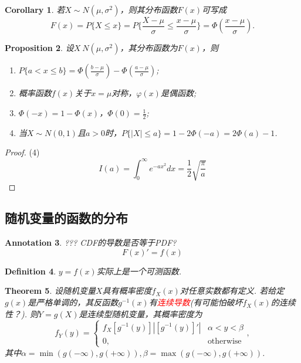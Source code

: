 \documentclass{article}
\newtheorem{theorem}{Theorem}[section]
\newtheorem{corollary}[theorem]{Corollary}
\newtheorem{proposition}[theorem]{Proposition}
\newtheorem{definition}[theorem]{Definition}
\newtheorem{annotation}[theorem]{Annotation}
\newcommand{\redt}[1]{\textcolor{red}{#1}}
\begin{document}
\begin{corollary}
\rm 若$X \sim N(\mu,\sigma^2)$，则其分布函数$F(x)$可写成
$$
F(x) = P\{X \leq x \} = P\{ \frac{X-\mu}{\sigma} \leq \frac{x-\mu}{\sigma} \} = \Phi(\frac{x-\mu}{\sigma}). 
$$
\end{corollary}

\begin{proposition}
\rm 设$X~N(\mu,\sigma^2)$，其分布函数为$F(x)$，则
\begin{enumerate}
	\item $P\{a < x \leq b\} = \Phi(\frac{b-\mu}{\sigma}) - \Phi(\frac{a-\mu}{\sigma})$;
	\item 概率函数$f(x)$关于$x=\mu$对称，$\varphi(x)$是偶函数;
	\item $\Phi(-x) = 1-\Phi(x)$，$\Phi(0) = \frac{1}{2}$;
	\item 当$X \sim N(0,1)$且$a > 0$时，$P\{|X| \leq a\} = 1-2\Phi(-a) = 2\Phi(a) - 1$. 
\end{enumerate}
\end{proposition}

\begin{proof}
{\color{red}(4)}
$$
I(a)=\int_0^{\infty}e^{-ax^2}dx =\frac12 \sqrt{\frac{\pi}{a}}
$$
\end{proof}

\subsection{随机变量的函数的分布}


\begin{annotation}
\rm ??? CDF的导数是否等于PDF?
$$
F(x)' = f(x)
$$
\end{annotation}

\begin{definition}
\rm $y=f(x)$实际上是一个可测函数. 
\end{definition}

\begin{theorem}
\rm 设随机变量$X$具有概率密度$f_X(x)$对任意实数都有定义. 若给定$g(x)$是严格单调的，其反函数$g^{-1}(x)$有\redt{连续导数}(有可能怕破坏$f_X(x)$的连续性？). 则$Y = g(X)$是连续型随机变量，其概率密度为
$$
f_Y(y) = \left\{ \begin{array}{ll}
f_X\left[ g^{-1}(y) \right]|\left[g^{-1}(y)\right]'| & \alpha < y < \beta \\
0 , & \text{otherwise}
\end{array}\right. ,
$$
其中$\alpha = \min(g(-\infty), g(+\infty)),\beta = \max(g(-\infty), g(+\infty))$. 
\end{theorem}
\end{document}
